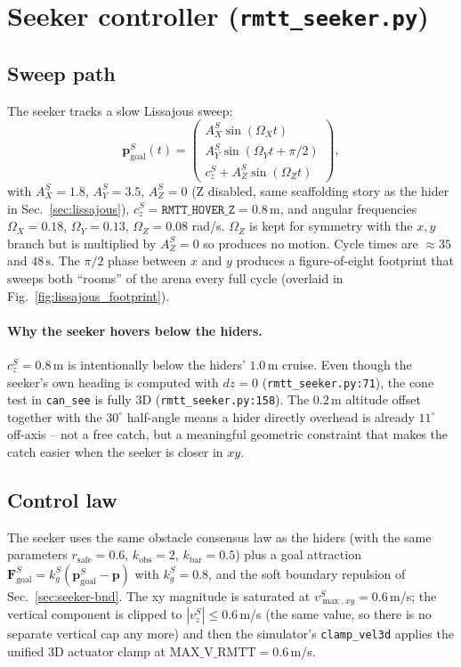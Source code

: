 \documentclass[11pt,a4paper]{article}
\newcommand{\code}[1]{\texttt{#1}}
\newcommand{\vect}[1]{\mathbf{#1}}
\begin{document}
\section{Seeker controller (\code{rmtt\_seeker.py})}

\subsection{Sweep path}
The seeker tracks a slow Lissajous sweep:
\[
    \vect{p}_\mathrm{goal}^{S}(t) = \begin{pmatrix}
        A_X^S \sin(\Omega_X t) \\
        A_Y^S \sin(\Omega_Y t + \pi/2) \\
        c_z^S + A_Z^S \sin(\Omega_Z t)
    \end{pmatrix},
\]
with $A_X^S = 1.8$, $A_Y^S = 3.5$, $A_Z^S = 0$ (Z disabled, same scaffolding
story as the hider in Sec.~\ref{sec:lissajous}), $c_z^S = \code{RMTT\_HOVER\_Z}
= 0.8$\,m, and angular frequencies $\Omega_X = 0.18$, $\Omega_Y = 0.13$,
$\Omega_Z = 0.08$ rad/s. $\Omega_Z$ is kept for symmetry with the $x, y$
branch but is multiplied by $A_Z^S = 0$ so produces no motion. Cycle times
are $\approx 35$ and $48\,\text{s}$. The $\pi/2$ phase between $x$ and $y$
produces a figure-of-eight footprint that sweeps both ``rooms'' of the arena
every full cycle (overlaid in Fig.~\ref{fig:lissajous_footprint}).

\paragraph{Why the seeker hovers below the hiders.}
$c_z^S = 0.8$\,m is intentionally below the hiders' $1.0$\,m cruise. Even
though the seeker's own heading is computed with $dz = 0$
(\code{rmtt\_seeker.py:71}), the cone test in \code{can\_see} is fully 3D
(\code{rmtt\_seeker.py:158}). The $0.2$\,m altitude offset together with the
$30^\circ$ half-angle means a hider directly overhead is already $11^\circ$
off-axis -- not a free catch, but a meaningful geometric constraint that
makes the catch easier when the seeker is closer in $xy$.

\subsection{Control law}
The seeker uses the same obstacle consensus law as the hiders (with the
same parameters $r_\mathrm{safe} = 0.6$, $k_\mathrm{obs} = 2$,
$k_\mathrm{bar} = 0.5$) plus a goal attraction
$\vect{F}_\mathrm{goal}^S = k_g^S (\vect{p}_\mathrm{goal}^S - \vect{p})$ with
$k_g^S = 0.8$, and the soft boundary repulsion of Sec.~\ref{sec:seeker-bnd}.
The xy magnitude is saturated at $v_{\max,xy}^S = 0.6$\,m/s; the vertical
component is clipped to $|v_z^S| \le 0.6$\,m/s (the same value, so there is
no separate vertical cap any more) and then the simulator's
\code{clamp\_vel3d} applies the unified 3D actuator clamp at
$\text{MAX\_V\_RMTT} = 0.6$\,m/s.
\end{document}

